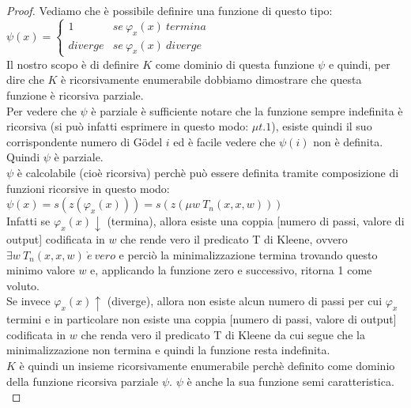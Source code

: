 \begin{proof}
  Vediamo che è possibile definire una funzione di questo tipo:\\

  $\psi(x)=\left\{ \begin{array}{ll}
  1 & se\ \varphi_{x}(x)\ termina\\
  diverge & se\ \varphi_{x}(x)\ diverge\end{array}\right.$\\

  Il nostro scopo è di definire $K$ come dominio di questa funzione $\psi$ e quindi, per dire che $K$ è ricorsivamente
  enumerabile dobbiamo dimostrare che questa funzione è ricorsiva parziale.\\

  Per vedere che $\psi$ è parziale è sufficiente notare che la funzione sempre indefinita è ricorsiva (si può infatti esprimere
  in questo modo: $\mu t . 1$), esiste quindi il suo corrispondente numero di G\"odel $i$ ed è facile vedere che $\psi(i)$ non è definita.
  Quindi $\psi$ è parziale.\\

  $\psi$ è calcolabile (cioè ricorsiva) perchè può essere definita tramite composizione di funzioni ricorsive in questo modo:\\

  $\psi(x) = s(z(\varphi_{x}(x))) = s(z(\mu w\ T_{n}(x,x,w)))$\\

  Infatti se $\varphi_x(x)\downarrow$ (termina), allora esiste una coppia [numero di passi, valore di output] codificata in $w$ che rende
  vero il predicato T di Kleene, ovvero $\exists w\ T_n(x,x,w)\ \grave e\ vero$ e perciò la minimalizzazione termina trovando questo minimo
  valore $w$ e, applicando la funzione zero e successivo, ritorna 1 come voluto.\\
  Se invece $\varphi_x(x)\uparrow$ (diverge), allora non esiste alcun numero di passi per cui $\varphi_x$ termini e in particolare non
  esiste una coppia [numero di passi, valore di output] codificata in $w$ che renda vero il predicato T di Kleene da cui segue che la 
  minimalizzazione non termina e quindi la funzione resta indefinita.\\

  $K$ è quindi un insieme ricorsivamente enumerabile perchè definito come dominio della funzione ricorsiva
  parziale $\psi$. $\psi$ è anche la sua funzione semi caratteristica.\\


\end{proof}
